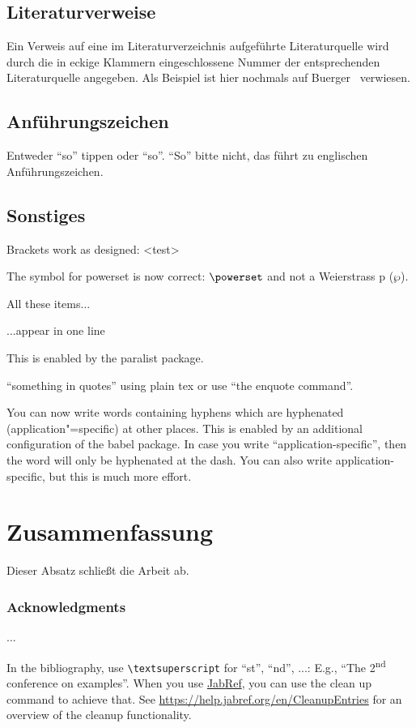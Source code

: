 \documentclass[runningheads,a4paper]{llncs}[2022/01/12]
\begin{document}
\subsection{Literaturverweise}
Ein Verweis auf eine im Literaturverzeichnis aufgeführte
Literaturquelle wird durch die in eckige Klammern eingeschlossene
Nummer der entsprechenden Literaturquelle angegeben. Als Beispiel ist
hier nochmals auf Buerger~\cite{buerger} verwiesen.

\subsection{Anführungszeichen}
Entweder "`so"' tippen oder \enquote{so}.
``So'' bitte nicht, das führt zu englischen Anführungszeichen.

\subsection{Sonstiges}
Brackets work as designed:
<test>

The symbol for powerset is now correct: $\powerset$ and not a Weierstrass p ($\wp$).

\begin{inparaenum}
\item All these items...
\item ...appear in one line
\item This is enabled by the paralist package.
\end{inparaenum}

``something in quotes'' using plain tex or use \enquote{the enquote command}.

You can now write words containing hyphens which are hyphenated (application"=specific) at other places.
This is enabled by an additional configuration of the babel package.
In case you write \enquote{application-specific}, then the word will only be hyphenated at the dash.
You can also write applica\allowbreak{}tion-specific, but this is much more effort.

\section{Zusammenfassung}
\label{sec:zusfas}
Dieser Absatz schließt die Arbeit ab.

\subsubsection*{Acknowledgments}
...

In the bibliography, use \texttt{\textbackslash textsuperscript} for ``st'', ``nd'', ...:
E.g., \enquote{The 2\textsuperscript{nd} conference on examples}.
When you use \href{https://www.jabref.org}{JabRef}, you can use the clean up command to achieve that.
See \url{https://help.jabref.org/en/CleanupEntries} for an overview of the cleanup functionality.


\BibliographySection
\end{document}
